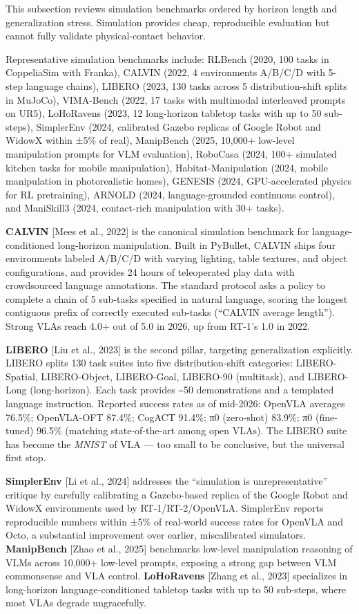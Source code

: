 This subsection reviews simulation benchmarks ordered by horizon length and generalization stress. Simulation provides cheap, reproducible evaluation but cannot fully validate physical-contact behavior.

Representative simulation benchmarks include: RLBench (2020, 100 tasks in CoppeliaSim with Franka), CALVIN (2022, 4 environments A/B/C/D with 5-step language chains), LIBERO (2023, 130 tasks across 5 distribution-shift splits in MuJoCo), VIMA-Bench (2022, 17 tasks with multimodal interleaved prompts on UR5), LoHoRavens (2023, 12 long-horizon tabletop tasks with up to 50 sub-steps), SimplerEnv (2024, calibrated Gazebo replicas of Google Robot and WidowX within ±5\% of real), ManipBench (2025, 10,000+ low-level manipulation prompts for VLM evaluation), RoboCasa (2024, 100+ simulated kitchen tasks for mobile manipulation), Habitat-Manipulation (2024, mobile manipulation in photorealistic homes), GENESIS (2024, GPU-accelerated physics for RL pretraining), ARNOLD (2024, language-grounded continuous control), and ManiSkill3 (2024, contact-rich manipulation with 30+ tasks).

\textbf{CALVIN} {[}Mees et al., 2022{]} is the canonical simulation benchmark for language-conditioned long-horizon manipulation. Built in PyBullet, CALVIN ships four environments labeled A/B/C/D with varying lighting, table textures, and object configurations, and provides 24 hours of teleoperated play data with crowdsourced language annotations. The standard protocol asks a policy to complete a chain of 5 sub-tasks specified in natural language, scoring the longest contiguous prefix of correctly executed sub-tasks (``CALVIN average length''). Strong VLAs reach 4.0+ out of 5.0 in 2026, up from RT-1's 1.0 in 2022.

\textbf{LIBERO} {[}Liu et al., 2023{]} is the second pillar, targeting generalization explicitly. LIBERO splits 130 task suites into five distribution-shift categories: LIBERO-Spatial, LIBERO-Object, LIBERO-Goal, LIBERO-90 (multitask), and LIBERO-Long (long-horizon). Each task provides \textasciitilde50 demonstrations and a templated language instruction. Reported success rates as of mid-2026: OpenVLA averages 76.5\%; OpenVLA-OFT 87.4\%; CogACT 91.4\%; π0 (zero-shot) 83.9\%; π0 (fine-tuned) 96.5\% (matching state-of-the-art among open VLAs). The LIBERO suite has become the \emph{MNIST} of VLA --- too small to be conclusive, but the universal first stop.

\textbf{SimplerEnv} {[}Li et al., 2024{]} addresses the ``simulation is unrepresentative'' critique by carefully calibrating a Gazebo-based replica of the Google Robot and WidowX environments used by RT-1/RT-2/OpenVLA. SimplerEnv reports reproducible numbers within ±5\% of real-world success rates for OpenVLA and Octo, a substantial improvement over earlier, miscalibrated simulators. \textbf{ManipBench} {[}Zhao et al., 2025{]} benchmarks low-level manipulation reasoning of VLMs across 10,000+ low-level prompts, exposing a strong gap between VLM commonsense and VLA control. \textbf{LoHoRavens} {[}Zhang et al., 2023{]} specializes in long-horizon language-conditioned tabletop tasks with up to 50 sub-steps, where most VLAs degrade ungracefully.

